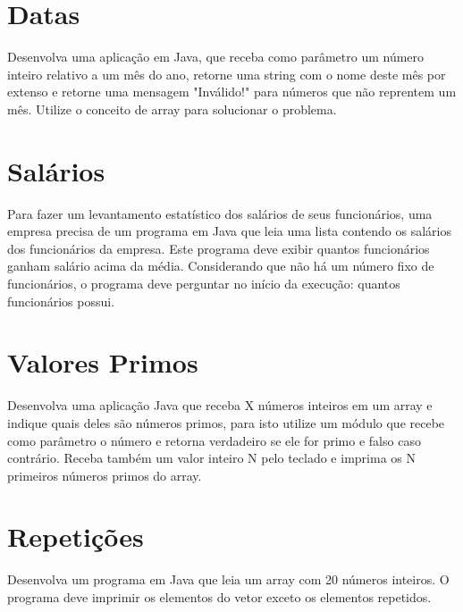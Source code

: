 \documentclass[12pt,a4paper, brazil]{article}
\begin{document}
\section{Datas}
\par
Desenvolva uma aplicação em Java, que receba como parâmetro um número inteiro relativo a um mês do ano, retorne uma string com o nome deste mês por extenso e retorne uma mensagem "Inválido!" para números que não reprentem um mês. Utilize o conceito de array para solucionar o problema. 

 \dotfill

\section{Salários}

Para fazer um levantamento estatístico dos salários de seus funcionários, uma empresa precisa de um programa em Java que leia uma lista contendo os salários dos funcionários da empresa. Este programa deve exibir quantos funcionários ganham salário acima da média. Considerando que não há um número fixo de funcionários, o programa deve perguntar no início da execução:  quantos funcionários possui. 

\dotfill

\section{Valores Primos}
\par
Desenvolva uma aplicação Java que receba X números inteiros em um array e indique quais deles são números primos, para isto utilize um módulo que recebe como parâmetro o número e retorna verdadeiro se ele for primo e falso caso contrário. Receba também um valor inteiro N pelo teclado e imprima os N primeiros números primos do array. 
 
 \dotfill

\section{Repetições}
\par
Desenvolva um programa em Java que leia um array com 20 números inteiros. O programa deve imprimir os elementos do vetor exceto os elementos repetidos. 
 
 \dotfill
\end{document}
